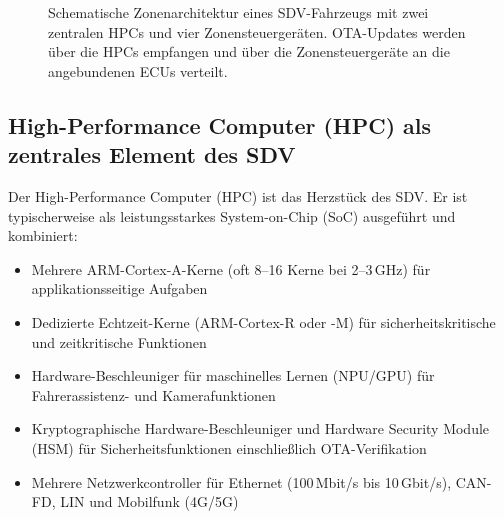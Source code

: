 ﻿\documentclass[12pt,a4paper,twoside]{article}
\begin{document}
\begin{figure}[htbp]
  \caption{Schematische Zonenarchitektur eines SDV-Fahrzeugs mit zwei zentralen
    HPCs und vier Zonensteuergeräten. OTA-Updates werden über die HPCs empfangen
    und über die Zonensteuergeräte an die angebundenen ECUs verteilt.}
  \label{fig:zonenarchitektur}
\end{figure}

\subsection{High-Performance Computer (HPC) als zentrales Element des SDV}
\label{subsec:hpc}

Der High-Performance Computer (HPC) ist das Herzstück des SDV. Er ist typischerweise
als leistungsstarkes System-on-Chip (SoC) ausgeführt und kombiniert:

\begin{itemize}
  \item Mehrere ARM-Cortex-A-Kerne (oft 8--16 Kerne bei 2--3\,GHz) für
    applikationsseitige Aufgaben
  \item Dedizierte Echtzeit-Kerne (ARM-Cortex-R oder -M) für sicherheitskritische
    und zeitkritische Funktionen
  \item Hardware-Beschleuniger für maschinelles Lernen (NPU/GPU) für
    Fahrerassistenz- und Kamerafunktionen
  \item Kryptographische Hardware-Beschleuniger und Hardware Security Module (HSM)
    für Sicherheitsfunktionen einschließlich OTA-Verifikation
  \item Mehrere Netzwerkcontroller für Ethernet (100\,Mbit/s bis 10\,Gbit/s),
    CAN-FD, LIN und Mobilfunk (4G/5G)
\end{itemize}
\end{document}
